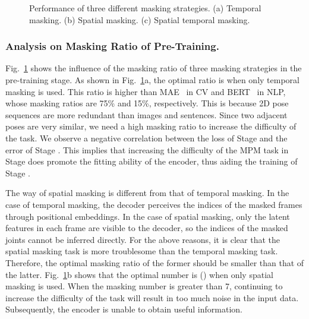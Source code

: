 \documentclass[]{llncs}
\newcommand{\RNum}[1]{\uppercase\expandafter{\romannumeral #1\relax}}
\begin{document}
\begin{figure}[t]
\centering
\scriptsize
{}
\vspace{-0.5cm}
\caption{Performance of three different masking strategies. (a) Temporal masking. (b) Spatial masking. (c) Spatial temporal masking.}
\vspace{0cm}
\label{fig:st_mask}
\end{figure}

\subsubsection{Analysis on Masking Ratio of Pre-Training.} Fig.~\ref{fig:st_mask} shows the influence of the masking ratio of three masking strategies in the pre-training stage. As shown in Fig.~\ref{fig:st_mask}a, the optimal ratio is  when only temporal masking is used. This ratio is higher than MAE~\cite{he2022masked} in CV and BERT~\cite{devlin2018bert} in NLP, whose masking ratios are 75\% and 15\%, respectively. This is because 2D pose sequences are more redundant than images and sentences. Since two adjacent poses are very similar, we need a high masking ratio to increase the difficulty of the task. We observe a negative correlation between the loss of Stage \RNum{1} and the error of Stage \RNum{2}. This implies that increasing the difficulty of the MPM task in Stage \RNum{1} does promote the fitting ability of the encoder, thus aiding the training of Stage \RNum{2}.

The way of spatial masking is different from that of temporal masking. In the case of temporal masking, the decoder perceives the indices of the masked frames through positional embeddings. In the case of spatial masking, only the latent features in each frame are visible to the decoder, so the indices of the masked joints cannot be inferred directly. For the above reasons, it is clear that the spatial masking task is more troublesome than the temporal masking task. Therefore, the optimal masking ratio of the former should be smaller than 
that of the latter. Fig.~\ref{fig:st_mask}b shows that the optimal number is  () when only spatial masking is used. When the masking number is greater than 7, continuing to increase the difficulty of the task will result in too much noise in the input data. Subsequently, the encoder is unable to obtain useful information.
\end{document}
